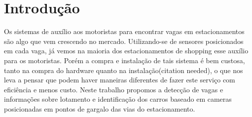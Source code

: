 \chapter{Introdução}

Os sistemas de auxílio aos motoristas para encontrar vagas em estacionamentos são algo que vem crescendo no mercado. Utilizando-se de sensores posicionados em cada vaga, já vemos na maioria dos estacionamentos de shopping esse auxílio para os motoristas. Porém a compra e instalação de tais sistema é bem custosa, tanto na compra do hardware quanto na instalação(citation needed), o que nos leva a pensar que podem haver maneiras diferentes de fazer este serviço com eficiência e menos custo. Neste trabalho propomos a detecção de vagas e informações sobre lotamento e identificação dos carros baseado em cameras posicionadas em pontos de gargalo das vias do estacionamento. 
